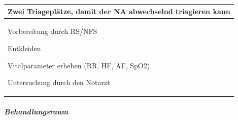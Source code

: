 \documentclass{article}
\begin{document}
\begin{center}
\begin{tabular}{|m{6.649cm}m{6.651cm}|}
\hline
\multicolumn{2}{|m{13.5cm}|}{\centering
{\bfseries\upshape\color[rgb]{0.0,0.0,0.5019608} Zwei Triagepl\"atze,
damit der NA abwechselnd triagieren kann}\par

}\\\hline
\multicolumn{1}{|m{6.649cm}|}{{\mdseries Vorbereitung durch RS/NFS}

{\mdseries Entkleiden}

{\mdseries Vitalparameter erheben (RR, HF, AF, SpO2)}

{\mdseries Untersuchung durch den Notarzt}

} &
{\centering   [Warning: Image ignored]
 \par}

\\\hline
\end{tabular}
\end{center}
\subparagraph[Behandlungsraum]{Behandlungsraum}
\end{document}
